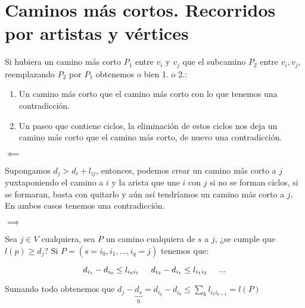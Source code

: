 \documentclass[openany]{book}
\begin{document}
\chapter{Caminos más cortos. Recorridos por artistas y vértices}





\begin{demonstration}
    Si hubiera un camino más corto $ P_1 $ entre $ v_i $ y $ v_j $ que el subcamino $ P_2 $ entre $ v_i,v_j $, reemplazando $ P_2 $ por $ P_1 $ obtenemos o bien 1. o 2.:
    \begin{enumerate}
        \item Un camino más corto que el camino más corto con lo que tenemos una contradicción.
        \item Un paseo que contiene ciclos, la eliminación de estos ciclos nos deja un camino más corto que el camino más corto, de nuevo una contradicción.
    \end{enumerate}
\end{demonstration}


\begin{demonstration}
    $ \impliedby $

    Supongamos $ d_j > d_i + l_{ij} $, entonces, podemos crear un camino más corto a $ j $ yuxtaponiendo el camino a $ i $ y la arista que une $ i $ con $ j $ si no se forman ciclos, si se formaran, basta con quitarlo y aún así tendríamos un camino más corto a $ j $. En ambos casos tenemos una contradicción.
    
    $ \implies $

    Sea $ j \in V $ cualquiera, sea $ P $ un camino cualquiera de $ s $ a $ j $, ¿se cumple que $ l(p) \geq d_j $? Si $ P = (s = i_0,i_1,...,i_{q}=j) $ tenemos que:

    $$ d_{i_1}-d_{i_0} \leq l_{i_0i_1} \hspace{5mm} d_{i_2}-d_{i_1} \leq l_{i_1i_2} \hspace{5mm} ...$$

    Sumando todo obtenemos que $d_j-\underbrace{d_{s}}_{0} = d_{i_q}-d_{i_0} \leq \sum\limits_{k}^{}l_{i_{k}i_{k+1}} = l(P)$

\end{demonstration}
\end{document}
